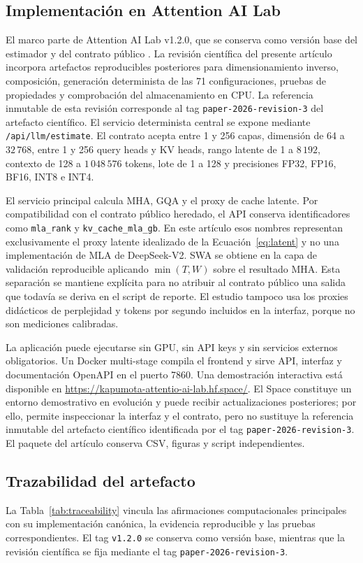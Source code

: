 \documentclass[a4paper,twocolumn]{article}
\begin{document}
\subsection{Implementación en Attention AI Lab}
El marco parte de Attention AI Lab v1.2.0, que se conserva como versión base del estimador y del contrato público \cite{lara2026attentionlab}. La revisión científica del presente artículo incorpora artefactos reproducibles posteriores para dimensionamiento inverso, composición, generación determinista de las 71 configuraciones, pruebas de propiedades y comprobación del almacenamiento en CPU. La referencia inmutable de esta revisión corresponde al tag \texttt{paper-2026-revision-3} del artefacto científico. El servicio determinista central se expone mediante \texttt{/api/llm/estimate}. El contrato acepta entre 1 y 256 capas, dimensión de 64 a $32\,768$, entre 1 y 256 query heads y KV heads, rango latente de 1 a $8\,192$, contexto de 128 a $1\,048\,576$ tokens, lote de 1 a 128 y precisiones FP32, FP16, BF16, INT8 e INT4.

El servicio principal calcula MHA, GQA y el proxy de cache latente. Por compatibilidad con el contrato público heredado, el API conserva identificadores como \texttt{mla\_rank} y \texttt{kv\_cache\_mla\_gb}. En este artículo esos nombres representan exclusivamente el proxy latente idealizado de la Ecuación~\eqref{eq:latent} y no una implementación de MLA de DeepSeek-V2. SWA se obtiene en la capa de validación reproducible aplicando $\min(T,W)$ sobre el resultado MHA. Esta separación se mantiene explícita para no atribuir al contrato público una salida que todavía se deriva en el script de reporte. El estudio tampoco usa los proxies didácticos de perplejidad y tokens por segundo incluidos en la interfaz, porque no son mediciones calibradas.

La aplicación puede ejecutarse sin GPU, sin API keys y sin servicios externos obligatorios. Un Docker multi-stage compila el frontend y sirve API, interfaz y documentación OpenAPI en el puerto 7860. Una demostración interactiva está disponible en \url{https://kapumota-attentio-ai-lab.hf.space/}. El Space constituye un entorno demostrativo en evolución y puede recibir actualizaciones posteriores; por ello, permite inspeccionar la interfaz y el contrato, pero no sustituye la referencia inmutable del artefacto científico identificada por el tag \texttt{paper-2026-revision-3}. El paquete del artículo conserva CSV, figuras y script independientes.

\subsection{Trazabilidad del artefacto}
La Tabla~\ref{tab:traceability} vincula las afirmaciones computacionales principales con su implementación canónica, la evidencia reproducible y las pruebas correspondientes. El tag \texttt{v1.2.0} se conserva como versión base, mientras que la revisión científica se fija mediante el tag \texttt{paper-2026-revision-3}.
\end{document}
